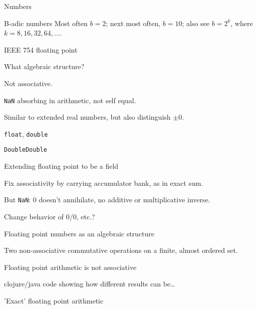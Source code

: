 \begin{plSection}{Numbers}
\begin{plSection}{B-adic numbers}
Most often $b=2$; 
next most often, $b=10$;
also see $b=2^k$, where $k=8,16,32,64,\ldots$.

\begin{plSection}{{IEEE} 754 floating point}

What algebraic structure?

Not associative.

\texttt{NaN} absorbing in arithmetic, not self equal.

Similar to extended real numbers, but also distinguish $\pm 0$.

\end{plSection}%
\begin{plSection}{\texttt{float}, \texttt{double}}

\end{plSection}%
\begin{plSection}{\texttt{DoubleDouble}}

\end{plSection}%
\begin{plSection}{Extending floating point to be a field}

Fix associativity by carrying accumulator bank,
as in exact sum.

But \texttt{NaN}: $0$ doesn't annihilate,
no additive or multiplicative inverse.

Change behavior of $0 / 0$, etc.?

\end{plSection}%
\begin{plSection}{Floating point numbers as an algebraic structure}

Two non-associative commutative operations on a finite,
almost ordered set.
\begin{plExample}{Floating point arithmetic is not associative}{}

clojure/java code showing how different results can be\ldots
 
\end{plExample}

\end{plSection}%
\begin{plSection}{'Exact' floating point arithmetic}
\cite{Higham:2002:ASNA,MullerEtal:2010:FPHandbook,ZhuHayes:2010:ExactSummation}


\end{plSection}
\end{plSection}
\end{plSection}
